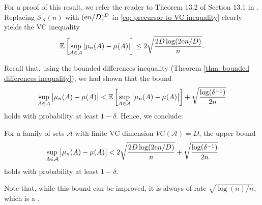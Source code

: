 For a proof of this result, we refer the reader to Theorem 13.2 of Section 13.1 in \cite[p.~216]{devroye1996probabilistic}. Replacing $\mathcal{S}_{\mathcal{A}}(n)$ with $(\mathrm{e} n/D)^D$ in \eqref{eq: precursor to VC inequality} clearly yields the VC inequality
\[
    \mathbb{E}\left[ \sup_{A \in \mathcal{A}} \abs{\mu_n(A) - \mu(A)} \right] \leq 2 \sqrt{\frac{2D \log(2 \mathrm{e} n / D)}{n}}.
\]

Recall that, using the bounded differences inequality (Theorem \ref{thm: bounded differences inequality}), we had shown that the bound
\[
    \sup_{A \in \mathcal{A}} \big\lvert \mu_n(A) - \mu(A) \big\rvert < \mathbb{E}\left[\sup_{A \in \mathcal{A}} \big\lvert \mu_n(A) - \mu(A) \big\rvert\right] + \sqrt{\frac{\log(\delta^{-1})}{2n}}
\]
holds with probability at least $1 - \delta$. Hence, we conclude:

\begin{corollary}[VC Inequality]
For a family of sets $\mathcal{A}$ with finite VC dimension $VC(\mathcal{A}) = D$, the upper bound
\[
    \sup_{A \in \mathcal{A}} \big\lvert \mu_n(A) - \mu(A) \big\rvert < 2 \sqrt{\frac{2D \log(2 \mathrm{e} n / D)}{n}} + \sqrt{\frac{\log(\delta^{-1})}{2n}}
\]
holds with probability at least $1 - \delta$.
\end{corollary}

Note that, while this bound can be improved, it is always of rate $\sqrt{\log(n) / n}$, which is a .
